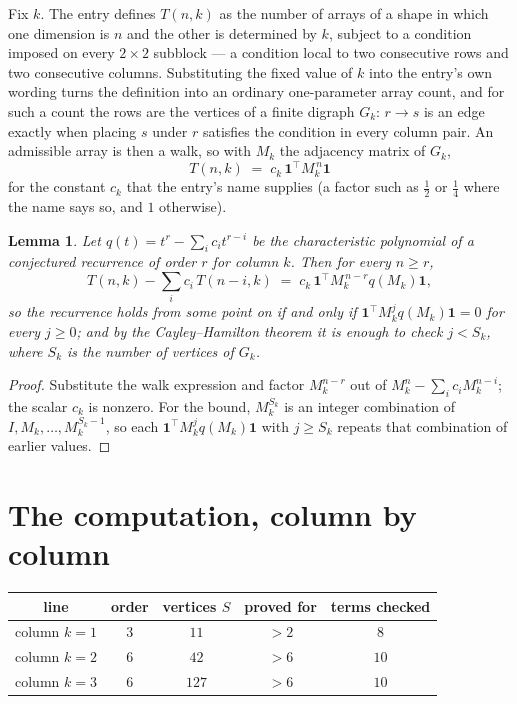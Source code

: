 \documentclass[11pt,a4paper]{article}
\theoremstyle{plain}
\newtheorem{lemma}[theorem]{Lemma}
\theoremstyle{definition}
\begin{document}
Fix $k$. The entry defines $T(n,k)$ as the number of arrays of a shape in which one dimension
is $n$ and the other is determined by $k$, subject to a condition imposed on every
$2\times2$ subblock --- a condition local to two consecutive rows and two consecutive columns.
Substituting the fixed value of $k$ into the entry's own wording turns the definition into an
ordinary one-parameter array count, and for such a count the rows are the vertices of a finite
digraph $G_k$: $r\to s$ is an edge exactly when placing $s$ under $r$ satisfies the condition
in every column pair. An admissible array is then a walk, so with $M_k$ the adjacency matrix
of $G_k$,
\[
T(n,k)\;=\;c_k\,\mathbf{1}^{\!\top}M_k^{\,n}\mathbf{1}
\]
for the constant $c_k$ that the entry's name supplies (a factor such as $\tfrac12$ or
$\tfrac14$ where the name says so, and $1$ otherwise).

\begin{lemma}\label{lem:crit}
Let $q(t)=t^{r}-\sum_i c_it^{r-i}$ be the characteristic polynomial of a conjectured
recurrence of order $r$ for column $k$. Then for every $n\ge r$,
\[
T(n,k)-\sum_i c_i\,T(n-i,k)\;=\;c_k\,\mathbf{1}^{\!\top}M_k^{\,n-r}q(M_k)\mathbf{1},
\]
so the recurrence holds from some point on if and only if
$\mathbf{1}^{\!\top}M_k^{j}q(M_k)\mathbf{1}=0$ for every $j\ge0$; and by the
Cayley--Hamilton theorem it is enough to check $j<S_k$, where $S_k$ is the number of vertices
of $G_k$.
\end{lemma}

\begin{proof}
Substitute the walk expression and factor $M_k^{n-r}$ out of $M_k^{n}-\sum_ic_iM_k^{n-i}$;
the scalar $c_k$ is nonzero. For the bound, $M_k^{S_k}$ is an integer combination of
$I,M_k,\dots,M_k^{S_k-1}$, so each $\mathbf{1}^{\!\top}M_k^{j}q(M_k)\mathbf{1}$ with
$j\ge S_k$ repeats that combination of earlier values.
\end{proof}

\section{The computation, column by column}

\begin{center}
\begin{tabular}{ccccc}
line & order & vertices $S$ & proved for & terms checked \\ \hline
column $k$$=1$ & $3$ & $11$ & $>2$ & $8$ \\
column $k$$=2$ & $6$ & $42$ & $>6$ & $10$ \\
column $k$$=3$ & $6$ & $127$ & $>6$ & $10$ \\
\end{tabular}
\end{center}
\end{document}
